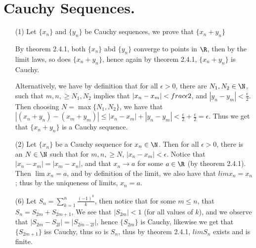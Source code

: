
\section{Cauchy Sequences.}

\begin{enumerate}[label=(\arabic*)]
    \item[(1)] Let $\{x_n\}$ and  $\{y_n\}$ be Cauchy sequences, we prove that 
        $\{x_n+y_n\}$

        By theorem 2.4.1, both $\{x_n\}$ abd  $\{y_n\}$ converge to points in 
        $\R$, then by the limit laws, so does $\{x_n+y_n\}$, hence again by 
        theorem 2.4.1,  $\{x_n+y_n\}$ is Cauchy.

        Alternatively, we have by definition that for all  $\epsilon>0$, there are  $N_1, 
        N_2 \in \N$, such that  $m,n, \geq N_1,N_2$ implies that $|x_n-x_m|<\\frac{\epsilon}{2}$, 
        and $|y_n-y_m|<\frac{\epsilon}{2}$. Then choosing  $N=\max\{N_1,N_2\}$, we have 
        that $|(x_n+y_n)-(x_m+y_m)| \leq |x_n-x_m|+|y_n-y_m|<\frac{\epsilon}{2}+\frac{\epsilon}{2}=\epsilon$.
        Thus we get that $\{x_n+y_n\}$ is a Cauchy sequence.

    \item[(2)] Let $\{x_n\}$ be a Cauchy sequence for  $x_n \in \N$. Then for all 
         $\epsilon>0$, there is an  $N \in \N$ such that for  $ m,n, \geq N$, $|x_n-x_m|<\epsilon$.
         Notice that  $|x_n-x_m|=|x_m-x_n|$, and that  $x_n \rightarrow a$ for some $a \in \R$  
         (by theorem 2.4.1). Then $\lim{x_n}=a$, and by definition of the limit, 
         we also have that  $lim{x_n}=x_n$ ; thus by the uniqueness of limits, 
         $x_n=a$.

     \item[(6)] Let  $S_n=\sum_{k=1}^{n} \frac{(-1)^k}{k}$, then notice that for 
         some $m \leq n$, that  $S_n=S_{2m}+S_{2m+1}$, We see that $|S_{2m}|<1$ (for all 
         values of $k$), and we observe that  $|S_{2m}-S_{2l}|=|S_{2m-2l}|$, hence 
         $\{S_{2m}\}$ is Cauchy, likewise we get that  $\{S_{2m+1}\}$ iss Cauchy, thus 
         so is  ${S_n}$, thus by theorem 2.4.1, $lim{S_n}$ exists and is finite.
\end{enumerate}
